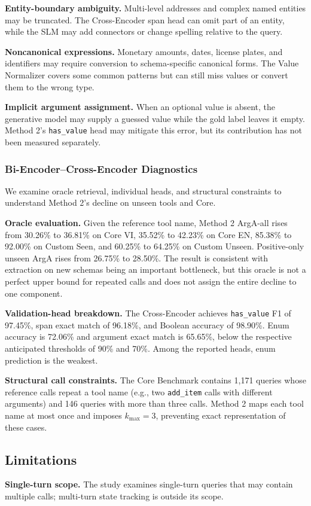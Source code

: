 \documentclass[10pt,twocolumn,a4paper]{article}
\begin{document}
\textbf{Entity-boundary ambiguity.} Multi-level addresses and complex named entities may be truncated. The Cross-Encoder span head can omit part of an entity, while the SLM may add connectors or change spelling relative to the query.

\textbf{Noncanonical expressions.} Monetary amounts, dates, license plates, and identifiers may require conversion to schema-specific canonical forms. The Value Normalizer covers some common patterns but can still miss values or convert them to the wrong type.

\textbf{Implicit argument assignment.} When an optional value is absent, the generative model may supply a guessed value while the gold label leaves it empty. Method 2's \texttt{has\_value} head may mitigate this error, but its contribution has not been measured separately.

\subsubsection{Bi-Encoder--Cross-Encoder Diagnostics}
We examine oracle retrieval, individual heads, and structural constraints to understand Method 2's decline on unseen tools and Core.

\textbf{Oracle evaluation.} Given the reference tool name, Method 2 ArgA-all rises from 30.26\% to 36.81\% on Core VI, 35.52\% to 42.23\% on Core EN, 85.38\% to 92.00\% on Custom Seen, and 60.25\% to 64.25\% on Custom Unseen. Positive-only unseen ArgA rises from 26.75\% to 28.50\%. The result is consistent with extraction on new schemas being an important bottleneck, but this oracle is not a perfect upper bound for repeated calls and does not assign the entire decline to one component.

\textbf{Validation-head breakdown.} The Cross-Encoder achieves \texttt{has\_value} F1 of 97.45\%, span exact match of 96.18\%, and Boolean accuracy of 98.90\%. Enum accuracy is 72.06\% and argument exact match is 65.65\%, below the respective anticipated thresholds of 90\% and 70\%. Among the reported heads, enum prediction is the weakest.

\textbf{Structural call constraints.} The Core Benchmark contains 1,171 queries whose reference calls repeat a tool name (e.g., two \texttt{add\_item} calls with different arguments) and 146 queries with more than three calls. Method 2 maps each tool name at most once and imposes $k_{\max}=3$, preventing exact representation of these cases.

\subsection{Limitations}
\textbf{Single-turn scope.} The study examines single-turn queries that may contain multiple calls; multi-turn state tracking is outside its scope.
\end{document}
